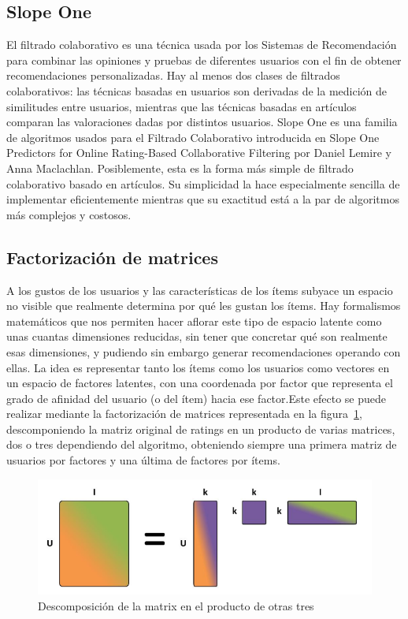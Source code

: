  	\subsection{Slope One}
	El filtrado colaborativo es una técnica usada por los Sistemas de Recomendación para combinar las opiniones y pruebas de diferentes usuarios con el fin de obtener recomendaciones personalizadas. Hay al menos dos clases de filtrados colaborativos: las técnicas basadas en usuarios son derivadas de la medición de similitudes entre usuarios, mientras que las técnicas basadas en artículos comparan las valoraciones dadas por distintos usuarios. Slope One es una familia de algoritmos usados para el Filtrado Colaborativo introducida en Slope One Predictors for Online Rating-Based Collaborative Filtering por Daniel Lemire y Anna Maclachlan. Posiblemente, esta es la forma más simple de filtrado colaborativo basado en artículos. Su simplicidad la hace especialmente sencilla de implementar eficientemente mientras que su exactitud está a la par de algoritmos más complejos y costosos.
 	
 	\subsection{Factorización de matrices}
 		A los gustos de los usuarios y las características de los ítems subyace un espacio no visible que realmente determina por qué les gustan los ítems. Hay formalismos matemáticos que nos permiten hacer aflorar este tipo de espacio latente como unas cuantas dimensiones reducidas, sin tener que concretar qué son realmente esas dimensiones, y pudiendo sin embargo generar recomendaciones operando con ellas. La idea es representar tanto los ítems como los usuarios como vectores en un espacio de factores latentes, con una coordenada por factor que representa el grado de afinidad del usuario (o del ítem) hacia ese factor.Este efecto se puede realizar mediante la factorización de matrices representada en la figura~\ref{fig: matrix factorization}, descomponiendo la matriz original de ratings en un producto de varias matrices, dos o tres dependiendo del algoritmo, obteniendo siempre una primera matriz de usuarios por factores y una última de factores por ítems.

 		\begin{figure}[h!]
		 \centering
		 \includegraphics[width=12cm]{./images/matrix_fact}
		 \caption{Descomposición de la matrix en el producto de otras tres}
		 \label{fig: matrix factorization}
		\end{figure}

